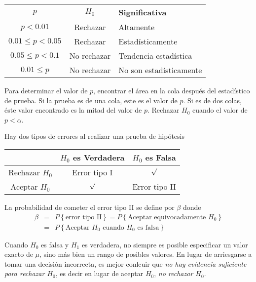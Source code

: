 \begin{frame}
\begin{frame}
\begin{tabular}{|c||c|l|}\hline
$p$& $H_{0}$&Significativa\\\hline\hline
$p<0.01$&Rechazar &Altamente\\\hline
$0.01\leq p<0.05$ & Rechazar&Estad\'isticamente\\\hline
$0.05\leq p <0.1$ & No rechazar & Tendencia estad\'istica\\\hline
$0.01\leq p$ & No rechazar & No son estad\'isticamente\\\hline
\end{tabular}

\begin{Note}
Para determinar el valor de $p$, encontrar el \'area en la cola despu\'es del estad\'istico de prueba. Si la prueba es de una cola, este es el valor de $p$. Si es de dos colas, \'este valor encontrado es la mitad del valor de $p$. Rechazar $H_{0}$ cuando el valor de $p<\alpha$.
\end{Note}




Hay dos tipos de errores al realizar una prueba de hip\'otesis
\begin{center}
\begin{tabular}{c|cc}
& $H_{0}$ es Verdadera & $H_{0}$ es Falsa\\\hline\hline
Rechazar $H_{0}$ & Error tipo I & $\surd$\\
Aceptar $H_{0}$ & $\surd$ & Error tipo II
\end{tabular}
\end{center}
\begin{Def}
La probabilidad de cometer el error tipo II se define por $\beta$ donde
\begin{eqnarray*}
\beta&=&P\left\{\textrm{error tipo II}\right\}=P\left\{\textrm{Aceptar equivocadamente }H_{0}\right\}\\
&=&P\left\{\textrm{Aceptar }H_{0}\textrm{ cuando }H_{0}\textrm{ es falsa}\right\}
\end{eqnarray*}
\end{Def}





\begin{Note}
Cuando $H_{0}$ es falsa y $H_{1}$ es verdadera, no siempre es posible especificar un valor exacto de $\mu$, sino m\'as bien un rango de posibles valores.\medskip
En lugar de arriesgarse a tomar una decisi\'on incorrecta, es mejor conlcuir que \textit{no hay evidencia suficiente para rechazar $H_{0}$}, es decir en lugar de aceptar $H_{0}$, \textit{no rechazar $H_{0}$}.


\end{Note}
\end{frame}
\end{frame}
